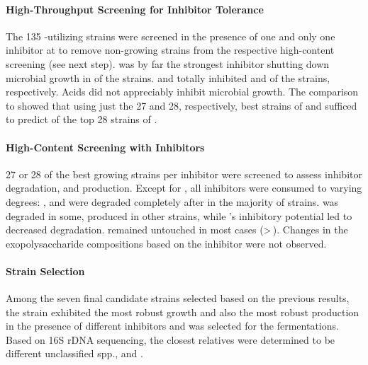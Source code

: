 \paragraph{High-Throughput Screening for Inhibitor Tolerance}
The 135 \xyl{}-utilizing strains were screened in the presence of one and only one \lch{} inhibitor at  to remove non-growing strains from the respective high-content screening (see next step). \VAN{} was by far the strongest inhibitor shutting down microbial growth in  of the strains. \FUR{} and \hmf{} totally inhibited  and  of the strains, respectively. Acids did not appreciably inhibit microbial growth. The comparison to \lch{} showed that using just the 27 and 28, respectively, best strains of \van{} and \acet{} sufficed to predict  of the top 28 strains of \lch{}.

\paragraph{High-Content Screening with Inhibitors}
27 or 28 of the best growing strains per inhibitor were screened to assess inhibitor degradation, \eps{} \amc{} and production. Except for \laev{}, all inhibitors were consumed to varying degrees: \fur{}, \hmf{} and \fora{} were degraded completely after  in the majority of strains. \Acet{} was degraded in some, produced in other strains, while \van{}'s inhibitory potential led to decreased degradation. \Laev{} remained untouched in most cases (>\,). Changes in the exopolysaccharide compositions based on the inhibitor were not observed.

\paragraph{Strain Selection}
Among the seven final candidate strains selected based on the previous results, the strain \strain{} exhibited the most robust growth and also the most robust \eps{} production in the presence of different inhibitors and was selected for the fermentations. Based on 16S rDNA sequencing, the closest relatives were determined to be different unclassified  spp.,  and .

